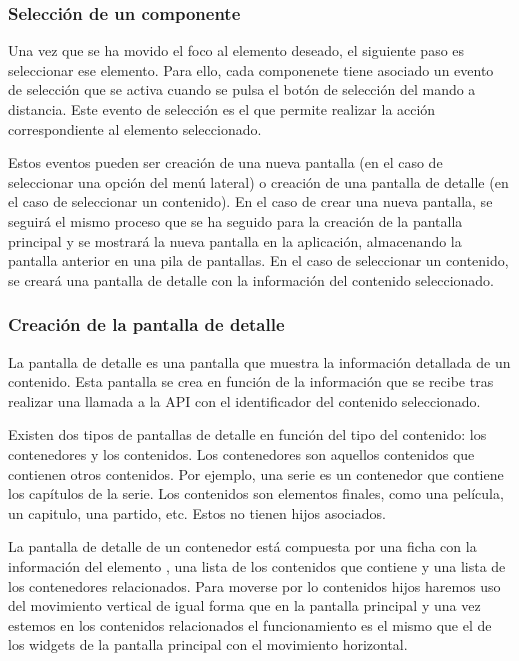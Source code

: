     

\subsubsection{Selección de un componente}
\label{sec:seleccion_componente}

Una vez que se ha movido el foco al elemento deseado, el siguiente paso es seleccionar ese elemento. Para ello, cada componenete tiene asociado un evento de selección
que se activa cuando se pulsa el botón de selección del mando a distancia. Este evento de selección es el que permite realizar la acción correspondiente al elemento
seleccionado. 

Estos eventos pueden ser creación de una nueva pantalla (en el caso de seleccionar una opción del menú lateral) o creación de una pantalla de detalle
(en el caso de seleccionar un contenido). En el caso de crear una nueva pantalla, se seguirá el mismo proceso que se ha seguido para la creación de la pantalla principal
y se mostrará la nueva pantalla en la aplicación, almacenando la pantalla anterior en una pila de pantallas. En el caso de seleccionar un contenido, se creará una pantalla
de detalle con la información del contenido seleccionado.

\subsubsection{Creación de la pantalla de detalle}
\label{sec:creacion_pantalla_detalle}

La pantalla de detalle es una pantalla que muestra la información detallada de un contenido. Esta pantalla se crea en función de la información que se 
recibe tras realizar una llamada a la API con el identificador del contenido seleccionado.

Existen dos tipos de pantallas de detalle en función del tipo del contenido: los contenedores y los contenidos. Los contenedores son aquellos contenidos que
contienen otros contenidos. Por ejemplo, una serie es un contenedor que contiene los capítulos de la serie. Los contenidos son elementos finales, como una película,
un capitulo, una partido, etc. Estos no tienen hijos asociados.

La pantalla de detalle de un contenedor está compuesta por una ficha con la información del elemento , una lista de los contenidos que contiene y una lista de los
contenedores relacionados. Para moverse por lo contenidos hijos haremos uso del movimiento vertical de igual forma que en la pantalla principal y una vez estemos 
en los contenidos relacionados el funcionamiento es el mismo que el de los widgets de la pantalla principal con el movimiento horizontal.

